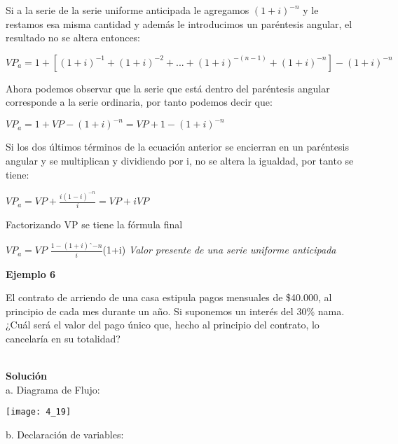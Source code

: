 {\begin{center}
\end{center}

Si a la serie de la serie uniforme anticipada le agregamos $(1+i)^{-n}$ y le restamos esa misma cantidad y además le introducimos un paréntesis angular, el resultado no se altera entonces:

\vspace{5mm}

	$VP_{a}= 1+[(1+i)^{-1} +(1+i)^{-2}+...+(1+i)^{-(n-1)} +(1+i)^{-n} ] -(1+i)^{-n}$
	
\vspace{5mm}
Ahora podemos observar que la serie que está dentro del paréntesis angular corresponde a la serie ordinaria, por tanto podemos decir que:

\vspace{5mm}
    
$VP_{a}= 1+VP-(1+i)^{-n}=VP+1-(1+i)^{-n}$
\vspace{5mm}

Si los dos últimos términos de la ecuación anterior se encierran en un paréntesis angular y se multiplican y dividiendo por i, no se altera la igualdad, por tanto se tiene:

\vspace{5mm}
	$VP_{a}=VP+\frac{i (1-i)^{-n} }{i}=VP+iVP$
\vspace{5mm}

Factorizando VP se tiene la fórmula final

\vspace{5mm}
	$VP_{a}=VP$ $\frac{1-(1+i)ˆ{-n}}{i}$(1+i) \hspace{35}\textit{Valor presente de una serie uniforme anticipada}\\
\vspace{5mm}

\textbf{Ejemplo 6}

\vspace{5mm}

El contrato de arriendo de una casa estipula pagos mensuales de \$40.000, al principio de cada mes durante un año. Si suponemos un interés del 30\% nama. ¿Cuál será el valor del pago único que, hecho al principio del contrato, lo cancelaría en su totalidad?
\\\\
\clearpage

\textbf{Solución}
\\
a. Diagrama de Flujo:\\

\begin{center}
	\texttt{[image: 4\_19]}
\end{center}
b. Declaración de variables: \\

}

